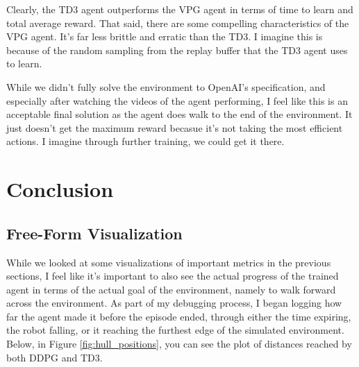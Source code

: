 \documentclass{article}
\begin{document}
Clearly, the TD3 agent outperforms the VPG agent in terms of time to learn and total average reward. That said, there are some compelling characteristics of the VPG agent. It's far less brittle and erratic than the TD3. I imagine this is because of the random sampling from the replay buffer that the TD3 agent uses to learn. 

While we didn't fully solve the environment to OpenAI's specification, and especially after watching the videos of the agent performing, I feel like this is an acceptable final solution as the agent does walk to the end of the environment. It just doesn't get the maximum reward becasue it's not taking the most efficient actions. I imagine through further training, we could get it there.


\section{Conclusion}
\label{sec:conclusion}

\subsection{Free-Form Visualization}
While we looked at some visualizations of important metrics in the previous sections, I feel like it's important to also see the actual progress of the trained agent in terms of the actual goal of the environment, namely to walk forward across the environment. As part of my debugging process, I began logging how far the agent made it before the episode ended, through either the time expiring, the robot falling, or it reaching the furthest edge of the simulated environment. Below, in Figure \ref{fig:hull_positions}, you can see the plot of distances reached by both DDPG and TD3.
\end{document}
